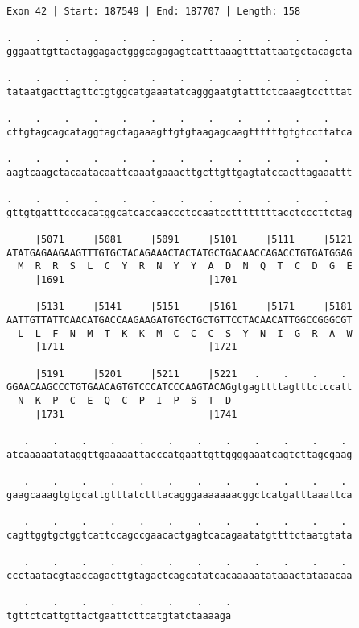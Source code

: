 \documentclass{article}
\begin{document}
\begin{Verbatim}
Exon 42 | Start: 187549 | End: 187707 | Length: 158
 
.    .    .    .    .    .    .    .    .    .    .    .    
gggaattgttactaggagactgggcagagagtcatttaaagtttattaatgctacagcta
  
.    .    .    .    .    .    .    .    .    .    .    .    
tataatgacttagttctgtggcatgaaatatcagggaatgtatttctcaaagtcctttat
  
.    .    .    .    .    .    .    .    .    .    .    .    
cttgtagcagcataggtagctagaaagttgtgtaagagcaagttttttgtgtccttatca
  
.    .    .    .    .    .    .    .    .    .    .    .    
aagtcaagctacaatacaattcaaatgaaacttgcttgttgagtatccacttagaaattt
  
.    .    .    .    .    .    .    .    .    .    .    .    
gttgtgatttcccacatggcatcaccaaccctccaatccttttttttacctcccttctag
  
     |5071     |5081     |5091     |5101     |5111     |5121
ATATGAGAAGAAGTTTGTGCTACAGAAACTACTATGCTGACAACCAGACCTGTGATGGAG
  M  R  R  S  L  C  Y  R  N  Y  Y  A  D  N  Q  T  C  D  G  E
     |1691                         |1701                    
  
     |5131     |5141     |5151     |5161     |5171     |5181
AATTGTTATTCAACATGACCAAGAAGATGTGCTGCTGTTCCTACAACATTGGCCGGGCGT
  L  L  F  N  M  T  K  K  M  C  C  C  S  Y  N  I  G  R  A  W
     |1711                         |1721                    
  
     |5191     |5201     |5211     |5221   .    .    .    . 
GGAACAAGCCCTGTGAACAGTGTCCCATCCCAAGTACAGgtgagttttagtttctccatt
  N  K  P  C  E  Q  C  P  I  P  S  T  D                     
     |1731                         |1741                    
  
   .    .    .    .    .    .    .    .    .    .    .    . 
atcaaaaatataggttgaaaaattacccatgaattgttggggaaatcagtcttagcgaag
  
   .    .    .    .    .    .    .    .    .    .    .    . 
gaagcaaagtgtgcattgtttatctttacagggaaaaaaacggctcatgatttaaattca
  
   .    .    .    .    .    .    .    .    .    .    .    . 
cagttggtgctggtcattccagccgaacactgagtcacagaatatgttttctaatgtata
  
   .    .    .    .    .    .    .    .    .    .    .    . 
ccctaatacgtaaccagacttgtagactcagcatatcacaaaaatataaactataaacaa
  
   .    .    .    .    .    .    .    .
tgttctcattgttactgaattcttcatgtatctaaaaga
\end{Verbatim}
\end{document}

